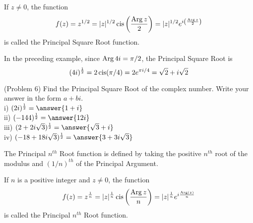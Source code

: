 \documentclass[handout]{ximera}
\begin{document}
\begin{definition}
If $z \neq 0$, the function
\[
f(z) = z^{1/2} =  |z|^{1/2} \operatorname{cis}\left(\frac{\operatorname{Arg} z}{2}\right) = |z|^{1/2} e^{i\left(\frac{\operatorname{Arg} z}{2}\right)}
\]
is called the Principal Square Root function.
\end{definition}


\begin{remark} In the preceding example, since $\operatorname{Arg} 4i = \pi/2$, the Principal Square Root is
\[
(4i)^{\frac12} = 2\operatorname{cis}(\pi/4) = 2e^{\pi i /4} = \sqrt 2 + i\sqrt 2
\] 
\end{remark}


\begin{problem}(Problem 6)
Find the Principal Square Root of the complex number. Write your answer in the form $a + bi$.\\
i) $(2i)^{\frac12} = \answer{1+i}$\\
ii) $(-144)^{\frac12} = \answer{12i}$\\
iii) $(2 + 2i\sqrt 3)^{\frac12} = \answer{\sqrt 3 + i}$\\
iv) $(-18+ 18i\sqrt 3)^{\frac12} = \answer{3 + 3i\sqrt 3}$\\
\end{problem}


The Principal $n^{th}$ Root function is defined by taking the positive $n^{th}$ root of the modulus and 
$(1/n)^{th}$ of the Principal Argument.

\begin{definition}
If $n$ is a positive integer and $z \neq 0$, the function
\[
f(z) = z^{\frac1n} =  |z|^{\frac1n} \operatorname{cis}\left(\frac{\operatorname{Arg} z}{n}\right) = |z|^{\frac1n} e^{i\frac{\operatorname{Arg}(z)}{n}}
\]
is called the Principal $n^{th}$ Root function.
\end{definition}
\end{document}
